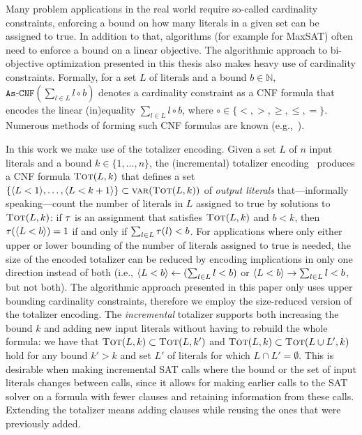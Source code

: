 Many problem applications in the real world require so-called cardinality constraints, enforcing a bound on how many literals in a given set can be assigned to true.
In addition to that, algorithms (for example for MaxSAT) often need to enforce a bound on a linear objective.
The algorithmic approach to bi-objective optimization presented in this thesis also makes heavy use of cardinality constraints.
Formally, for a set $L$ of literals and a bound $b \in \mathbb{N}$, $\texttt{As-CNF}\left(\sum_{l \in L} l \circ b\right)$ denotes a cardinality constraint as a CNF formula that encodes the linear (in)equality $\sum_{l \in L} l \circ b$, where $\circ \in \{< ,> ,\geq, \leq, =\}$.
Numerous methods of forming such CNF formulas are known (e.g.,~\autocites{DBLP:conf/cp/BailleuxB03,DBLP:conf/cp/Sinz05,DBLP:journals/jsat/EenS06}).

In this work we make use of the totalizer encoding.
Given a set $L$ of $n$ input literals and a bound $k\in\{1,\dots,n\}$, the (incremental) totalizer encoding~\autocites{DBLP:conf/cp/BailleuxB03,DBLP:conf/cp/MartinsJML14} produces a CNF formula $\textsc{Tot}(L, k)$ that defines a set $\{\langle L < 1 \rangle, \ldots, \langle L < k+1 \rangle\} \subset \textsc{var}(\textsc{Tot}(L,k))$ of \emph{output literals} that---informally speaking---count the number of literals in $L$ assigned to true by solutions to $\textsc{Tot}(L,k)$:
if $\tau$ is an assignment that satisfies $\textsc{Tot}(L,k)$ and $b < k$, then $\tau(\langle L < b \rangle) = 1$ if and only if $\sum_{l \in L} \tau(l) < b$.
For applications where only either upper or lower bounding of the number of literals assigned to true is needed, the size of the encoded totalizer can be reduced by encoding implications in only one direction instead of both (i.e., $\langle L < b \rangle \leftarrow (\sum_{l \in L} l < b)$ or $\langle L < b \rangle \rightarrow \sum_{l \in L} l < b$, but not both).
The algorithmic approach presented in this paper only uses upper bounding cardinality constraints, therefore we employ the size-reduced version of the totalizer encoding.
The \emph{incremental} totalizer supports both increasing the bound $k$ and adding new input literals without having to rebuild the whole formula:
we have that $\textsc{Tot}(L, k) \subset \textsc{Tot}(L, k')$ and $\textsc{Tot}(L, k) \subset  \textsc{Tot}(L \cup L', k)$ hold for any bound $k' > k$ and set $L'$ of literals for which $L \cap L' =  \emptyset$. 
This is desirable when making incremental SAT calls where the bound or the set of input literals changes between calls, since it allows for making earlier calls to the SAT solver on a formula with fewer clauses and retaining information from these calls.
Extending the totalizer means adding clauses while reusing the ones that were previously added.


